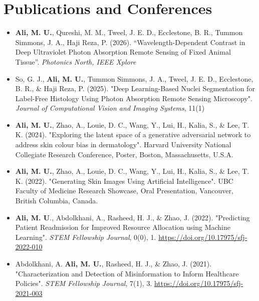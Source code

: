 
\section{Publications and Conferences}

\begin{itemize}[leftmargin=0.15in, label={}]
    \item{\textbf{Ali, M. U.}, Qureshi, M. M., Tweel, J. E. D., Ecclestone, B. R., Tummon Simmons, J. A.,  Haji Reza, P. (2026). ``Wavelength-Dependent Contrast in Deep Ultraviolet Photon Absorption Remote Sensing of Fixed Animal Tissue''. \textit{Photonics North, IEEE Xplore}}
    
    \item{So, G. J., \textbf{Ali, M. U.}, Tummon Simmons, J. A., Tweel, J. E. D., Ecclestone, B. R., \& Haji Reza, P. (2025). "Deep Learning-Based Nuclei Segmentation for Label-Free Histology Using Photon Absorption Remote Sensing Microscopy". \textit{Journal of Computational Vision and Imaging Systems}, 11(1)}
    
    \item{\textbf{Ali, M. U.}, Zhao, A., Louie, D. C., Wang, Y., Lui, H., Kalia, S., \& Lee, T. K. (2024). "Exploring the latent space of a generative adversarial network to address skin colour bias in dermatology". Harvard University National Collegiate Research Conference, Poster, Boston, Massachusetts, U.S.A.}

    \item{\textbf{Ali, M. U.}, Zhao, A., Louie, D. C., Wang, Y., Lui, H., Kalia, S., \& Lee, T. K. (2022). "Generating Skin Images Using Artificial Intelligence". UBC Faculty of Medicine Research Showcase, Oral Presentation, Vancouver, British Columbia, Canada.}

    \item{\textbf{Ali, M. U}., Abdolkhani, A., Rasheed, H. J., \& Zhao, J. (2022). "Predicting Patient Readmission for Improved Resource Allocation using Machine Learning". \textit{STEM Fellowship Journal}, 0(0), 1. \url{https://doi.org/10.17975/sfj-2022-010}}
        
    \item{Abdolkhani, A. \textbf{Ali, M. U.}, Rasheed, H. J., \& Zhao, J. (2021). "Characterization and Detection of Misinformation to Inform Healthcare Policies". \textit{STEM Fellowship Journal}, 7(1), 3. \url{https://doi.org/10.17975/sfj-2021-003}}
\end{itemize}
    



